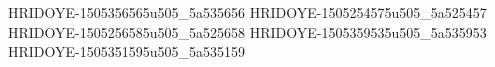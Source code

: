HRIDOYE-1505356565u505_5a535656
HRIDOYE-1505254575u505_5a525457
HRIDOYE-1505256585u505_5a525658
HRIDOYE-1505359535u505_5a535953
HRIDOYE-1505351595u505_5a535159

